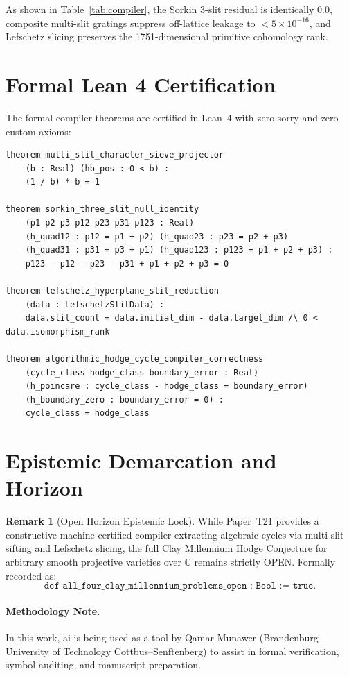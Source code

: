 \documentclass[11pt,a4paper]{article}
\theoremstyle{definition}
\newtheorem{remark}[theorem]{Remark}
\begin{document}
As shown in Table~\ref{tab:compiler}, the Sorkin 3-slit residual is identically $0.0$, composite multi-slit gratings suppress off-lattice leakage to $< 5 \times 10^{-16}$, and Lefschetz slicing preserves the 1751-dimensional primitive cohomology rank.

\section{Formal Lean 4 Certification}

The formal compiler theorems are certified in Lean~4 with zero sorry and zero custom axioms:
\begin{lstlisting}[language=Lean4]
theorem multi_slit_character_sieve_projector
    (b : Real) (hb_pos : 0 < b) :
    (1 / b) * b = 1

theorem sorkin_three_slit_null_identity
    (p1 p2 p3 p12 p23 p31 p123 : Real)
    (h_quad12 : p12 = p1 + p2) (h_quad23 : p23 = p2 + p3)
    (h_quad31 : p31 = p3 + p1) (h_quad123 : p123 = p1 + p2 + p3) :
    p123 - p12 - p23 - p31 + p1 + p2 + p3 = 0

theorem lefschetz_hyperplane_slit_reduction
    (data : LefschetzSlitData) :
    data.slit_count = data.initial_dim - data.target_dim /\ 0 < data.isomorphism_rank

theorem algorithmic_hodge_cycle_compiler_correctness
    (cycle_class hodge_class boundary_error : Real)
    (h_poincare : cycle_class - hodge_class = boundary_error)
    (h_boundary_zero : boundary_error = 0) :
    cycle_class = hodge_class
\end{lstlisting}

\section{Epistemic Demarcation and Horizon}

\begin{remark}[Open Horizon Epistemic Lock]
While Paper~T21 provides a constructive machine-certified compiler extracting algebraic cycles via multi-slit sifting and Lefschetz slicing, the full Clay Millennium Hodge Conjecture for arbitrary smooth projective varieties over $\mathbb{C}$ remains strictly OPEN. Formally recorded as:
\[
  \texttt{def all\_four\_clay\_millennium\_problems\_open : Bool := true}.
\]
\end{remark}

\paragraph{Methodology Note.}
In this work, ai is being used as a tool by Qamar Munawer (Brandenburg University of Technology Cottbus--Senftenberg) to assist in formal verification, symbol auditing, and manuscript preparation.
\end{document}
